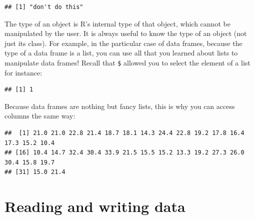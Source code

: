 \documentclass[
]{article}
\newenvironment{Shaded}{\begin{snugshade}}{\end{snugshade}}
\newcommand{\DecValTok}[1]{\textcolor[rgb]{0.00,0.00,0.81}{#1}}
\newcommand{\FunctionTok}[1]{\textcolor[rgb]{0.00,0.00,0.00}{#1}}
\newcommand{\NormalTok}[1]{#1}
\newcommand{\OtherTok}[1]{\textcolor[rgb]{0.56,0.35,0.01}{#1}}
\newcommand{\SpecialCharTok}[1]{\textcolor[rgb]{0.00,0.00,0.00}{#1}}
\newcommand{\StringTok}[1]{\textcolor[rgb]{0.31,0.60,0.02}{#1}}
\begin{document}
\begin{verbatim}
## [1] "don't do this"
\end{verbatim}

The type of an object is R's internal type of that object, which cannot be manipulated by the user.
It is always useful to know the type of an object (not just its class). For example, in the particular
case of data frames, because the type of a data frame is a list, you can use all that you learned
about lists to manipulate data frames! Recall that \texttt{\$} allowed you to select the element of a list
for instance:

\begin{Shaded}
\end{Shaded}

\begin{verbatim}
## [1] 1
\end{verbatim}

Because data frames are nothing but fancy lists, this is why you can access columns the same way:

\begin{Shaded}
\end{Shaded}

\begin{verbatim}
##  [1] 21.0 21.0 22.8 21.4 18.7 18.1 14.3 24.4 22.8 19.2 17.8 16.4 17.3 15.2 10.4
## [16] 10.4 14.7 32.4 30.4 33.9 21.5 15.5 15.2 13.3 19.2 27.3 26.0 30.4 15.8 19.7
## [31] 15.0 21.4
\end{verbatim}

\hypertarget{reading-and-writing-data}{%
\section{Reading and writing data}\label{reading-and-writing-data}}
\end{document}
